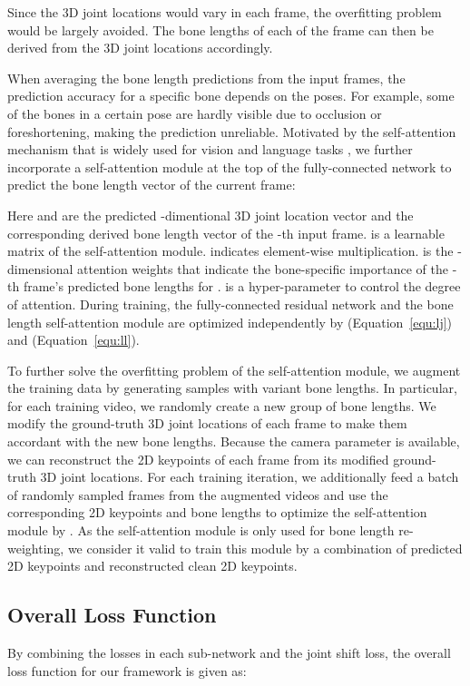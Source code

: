 \documentclass[journal]{IEEEtran}
\begin{document}
Since the 3D joint locations would vary in each frame, the overfitting problem would be largely avoided.  The bone lengths of each of the  frame can then be derived from the 3D joint locations accordingly.

When averaging the bone length predictions from the input frames, the prediction accuracy for a specific bone depends on the poses. For example, some of the bones in a certain pose are hardly visible due to occlusion or foreshortening, making the prediction unreliable. Motivated by the self-attention mechanism that is widely used for vision and language tasks \cite{vaswani2017attention,yu2019multimodal,yu2020deep,li2019beyond,8920126}, we further incorporate a self-attention module at the top of the fully-connected network to predict the bone length vector  of the current frame:
\vspace{-1mm}

Here  and  are the predicted -dimentional 3D joint location vector and the corresponding derived bone length vector of the -th input frame.  is a learnable matrix of the self-attention module.  indicates element-wise multiplication.  is the -dimensional attention weights that indicate the bone-specific importance of the -th frame's predicted bone lengths for .  is a hyper-parameter to control the degree of attention. During training, the fully-connected residual network and the bone length self-attention module are optimized independently by  (Equation~\ref{equ:lj}) and  (Equation~\ref{equ:ll}). 

To further solve the overfitting problem of the self-attention module, we augment the training data by generating samples with variant bone lengths. In particular, for each training video, we randomly create a new group of  bone lengths. We modify the ground-truth 3D joint locations of each frame to make them accordant with the new bone lengths. Because the camera parameter is available, we can reconstruct the 2D keypoints of each frame from its modified ground-truth 3D joint locations. For each training iteration, we additionally feed a batch of randomly sampled  frames from the augmented videos and use the corresponding 2D keypoints and bone lengths to optimize the self-attention module by  . As the self-attention module is only used for bone length re-weighting, we consider it valid to train this module by a combination of predicted 2D keypoints and reconstructed clean 2D keypoints.  

\subsection{Overall Loss Function} \label{sec:training}
By combining the losses in each sub-network and the joint shift loss, the overall loss function for our framework is given as:
\vspace{-1mm}
\end{document}
